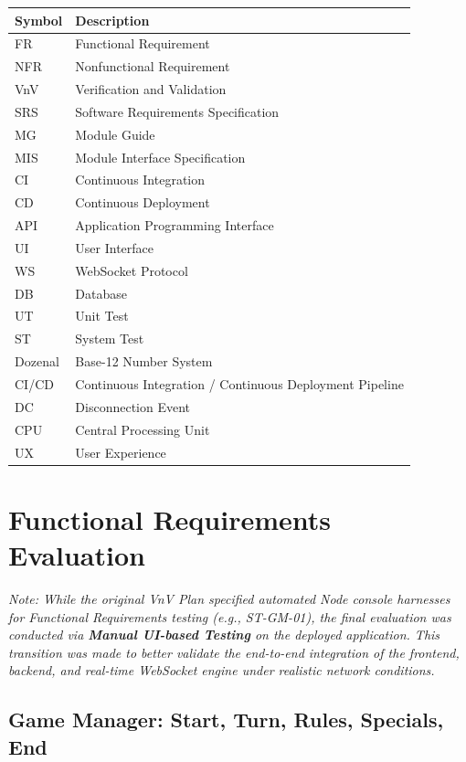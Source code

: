 \documentclass[12pt, titlepage]{article}
\begin{document}
      \renewcommand{\arraystretch}{1.2}
      \begin{tabular}{l l}
      \toprule
      \textbf{Symbol} & \textbf{Description} \\
      \midrule
      FR & Functional Requirement \\
      NFR & Nonfunctional Requirement \\
      VnV & Verification and Validation \\
      SRS & Software Requirements Specification \\
      MG & Module Guide \\
      MIS & Module Interface Specification \\
      CI & Continuous Integration \\
      CD & Continuous Deployment \\
      API & Application Programming Interface \\
      UI & User Interface \\
      WS & WebSocket Protocol \\
      DB & Database \\
      UT & Unit Test \\
      ST & System Test \\
      Dozenal & Base-12 Number System \\
      CI/CD & Continuous Integration / Continuous Deployment Pipeline \\
      DC & Disconnection Event \\
      CPU & Central Processing Unit \\
      UX & User Experience \\
      \bottomrule
      \end{tabular}

   \section{Functional Requirements Evaluation}

\textit{Note: While the original VnV Plan specified automated Node console harnesses for Functional Requirements testing (e.g., ST-GM-01), the final evaluation was conducted via \textbf{Manual UI-based Testing} on the deployed application. This transition was made to better validate the end-to-end integration of the frontend, backend, and real-time WebSocket engine under realistic network conditions.}

\subsection{Game Manager: Start, Turn, Rules, Specials, End }
\end{document}

